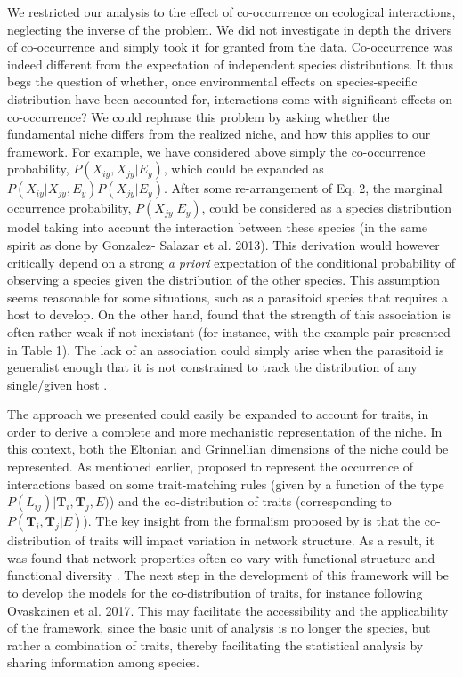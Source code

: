 \documentclass[12pt]{article}
\begin{document}
We restricted our analysis to the effect of co-occurrence on ecological
interactions, neglecting the inverse of the problem. We did not investigate in
depth the drivers of co-occurrence and simply took it for granted from the
data. Co-occurrence was indeed different from the expectation of independent
species distributions. It thus begs the question of whether, once
environmental effects on species-specific distribution have been accounted
for, interactions come with significant effects on co-occurrence? We could
rephrase this problem by asking whether the fundamental niche differs from the
realized niche, and how this applies to our framework. For example, we have
considered above simply the co-occurrence probability, $P(X_{iy},X_{jy}|E_y)$,
which could be expanded as $P(X_{iy}|X_{jy},E_y) P(X_{jy}| E_y )$. After some
re-arrangement of Eq. 2, the marginal occurrence probability, $P(X_{jy}|E_y
)$, could be considered as a species distribution model taking into account
the interaction between these species (in the same spirit as done by Gonzalez-
Salazar et al. 2013). This derivation would however critically depend on a
strong \emph{a priori} expectation of the conditional probability of observing
a species given the distribution of the other species. This assumption seems
reasonable for some situations, such as a parasitoid species that requires a
host to develop. On the other hand, \citet{Cazelles2016b} found that the
strength of this association is often rather weak if not inexistant (for
instance, with the example pair presented in Table 1). The lack of an
association could simply arise when the parasitoid is generalist enough that
it is not constrained to track the distribution of any single/given host
\citep{Cazelles2015}.

The approach we presented could easily be expanded to account for traits, in
order to derive a complete and more mechanistic representation of the niche.
In this context, both the Eltonian and Grinnellian dimensions of the niche
could be represented. As mentioned earlier, \citealt{Gravel2016} proposed to
represent the occurrence of interactions based on some trait-matching rules
(given by a function of the type $P(L_{ij})|\mathbf{T}_i, \mathbf{T}_j, E)$)
and the co-distribution of traits (corresponding to $P(\mathbf{T}_i,
\mathbf{T}_j|E)$). The key  insight from the formalism proposed by
\citealt{Gravel2016} is that the co-distribution of traits will impact
variation in network structure. As a result, it was found that network
properties often co-vary with functional structure and functional diversity
\citealp{Laigle2018}. The next step in the development of this framework will
be to develop the models for the co-distribution of traits, for instance
following Ovaskainen et al. 2017. This may facilitate the accessibility and
the applicability of the framework, since the basic unit of analysis is no
longer the species, but rather a combination of traits, thereby facilitating
the statistical analysis by sharing information among species.
\end{document}
